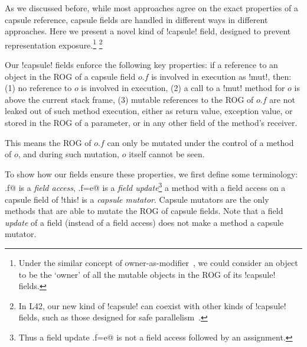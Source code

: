 

As we discussed before, while most approaches agree on the exact properties of a capsule reference,
capsule fields are handled in different ways in different approaches. 
Here we present a novel kind of \Q!capsule! field, designed
to prevent representation exposure.\footnote{Under the similar concept of owner-as-modifier~\cite{Dietl05universes:lightweight,10.1007/978-3-540-92188-2_4}, we could consider an object to be the `owner' of all the mutable objects in the ROG of its \Q!capsule! fields.}
\footnote{
In L42, our new kind of \Q!capsule! can coexist with other kinds of \Q!capsule! fields, such as those designed for safe parallelism~\cite{GordonEtAl12,clebsch2015deny,GIANNINI2019145}.}



Our \Q!capsule! fields enforce the following key properties: if a reference to an object in the ROG of a capsule field $o.f$ is involved in execution as \Q!mut!, then:
(1) no reference to $o$ is involved in execution, (2) a call to a \Q!mut! method for $o$ is above the current stack frame,
(3) mutable references to the ROG of $o.f$ are not leaked out of such method execution, either as return value, exception value, or stored in the ROG of a parameter, or in any other field of the method's receiver.

This means the ROG of $o.f$ can only be mutated under the control of a \Q@mut@ method of $o$, and during such mutation, $o$ itself cannot be seen.

To show how our \Q@capsule@ fields ensure these properties, we first define some terminology:
\Q@x.f@ is a \emph{field access}, \Q@x.f=e@ is a \emph {field update}\footnote{Thus a field update \Q@x.f=e@ is not a field access followed by an assignment.}
a \Q@mut@ method with a field access on a capsule field of \Q!this! is a \emph{capsule mutator}. 
Capsule mutators are the only methods that are able to mutate the ROG of capsule fields. Note that a field \emph{update} of a \Q@capsule@ field (instead of a field access) does not make a method a capsule mutator.

